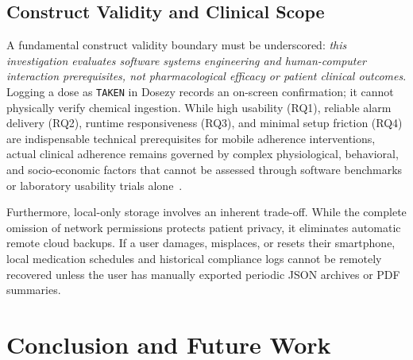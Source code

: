 \documentclass[11pt,a4paper]{article}
\begin{document}
\subsection{Construct Validity and Clinical Scope}
A fundamental construct validity boundary must be underscored: \emph{this investigation evaluates software systems engineering and human-computer interaction prerequisites, not pharmacological efficacy or patient clinical outcomes}. Logging a dose as \texttt{TAKEN} in Dosezy records an on-screen confirmation; it cannot physically verify chemical ingestion. While high usability (RQ1), reliable alarm delivery (RQ2), runtime responsiveness (RQ3), and minimal setup friction (RQ4) are indispensable technical prerequisites for mobile adherence interventions, actual clinical adherence remains governed by complex physiological, behavioral, and socio-economic factors that cannot be assessed through software benchmarks or laboratory usability trials alone~\cite{who2003adherence,haynes2002helping}.

Furthermore, local-only storage involves an inherent trade-off. While the complete omission of network permissions protects patient privacy, it eliminates automatic remote cloud backups. If a user damages, misplaces, or resets their smartphone, local medication schedules and historical compliance logs cannot be remotely recovered unless the user has manually exported periodic JSON archives or PDF summaries.

\section{Conclusion and Future Work}
\label{sec:conclusion}
\end{document}

